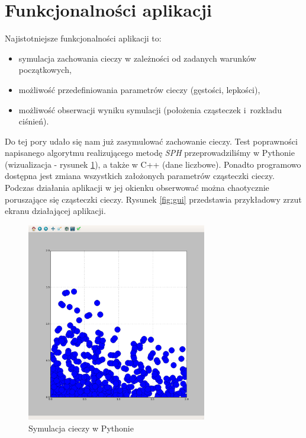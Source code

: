 
\section{Funkcjonalności aplikacji}

Najistotniejsze funkcjonalności aplikacji to:
\begin{itemize}
    \item symulacja zachowania cieczy w zależności od zadanych warunków początkowych,
    \item możliwość przedefiniowania parametrów cieczy (gęstości, lepkości),
    \item możliwość obserwacji wyniku symulacji (położenia cząsteczek i~rozkładu ciśnień).
\end{itemize}

Do tej pory udało się nam już zasymulować zachowanie cieczy. Test poprawności napisanego algorytmu realizującego metodę \textit{SPH} przeprowadziliśmy w \textsf{Pythonie} (wizualizacja - rysunek \ref{fig:python}), a także w \textsf{C++} (dane liczbowe). Ponadto programowo dostępna jest zmiana wszystkich założonych parametrów cząsteczki cieczy. Podczas działania aplikacji w jej okienku obserwować można chaotycznie poruszające się cząsteczki cieczy. Rysunek \ref{fig:gui} przedstawia przykładowy zrzut ekranu działającej aplikacji.

\begin{figure}[H]
 \begin{center}
  \includegraphics[width=0.7\textwidth]{rysunki/pythonViz.png}
 \end{center}
 \caption{Symulacja cieczy w Pythonie}
 \label{fig:python}
\end{figure}

